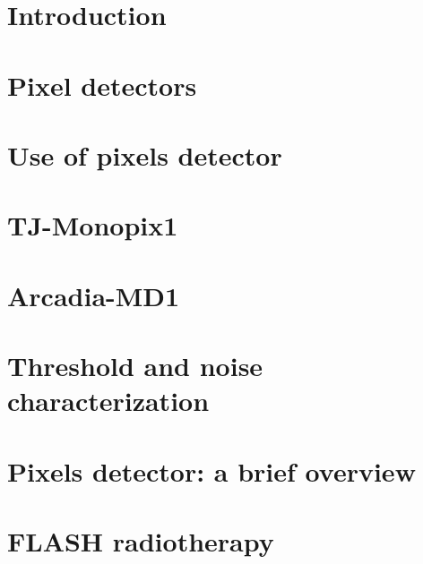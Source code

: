\documentclass[a4paper]{report}
\begin{document}
\tableofcontents



\chapter{Introduction}


\chapter{Pixel detectors}


\chapter{Use of pixels detector}


\chapter{TJ-Monopix1}


\chapter{Arcadia-MD1}


\chapter{Threshold and noise characterization}


\appendix
\chapter{Pixels detector: a brief overview}


\chapter{FLASH radiotherapy}



\printbibliography[heading=bibintoc, title={Bibliography}] 
\end{document}
